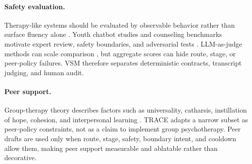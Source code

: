 \paragraph{Safety evaluation.}
Therapy-like systems should be evaluated by observable behavior rather than surface fluency alone \citep{Chiu2024LLMTherapists}. Youth chatbot studies and counseling benchmarks motivate expert review, safety boundaries, and adversarial tests \citep{Sobowale2025CAPEII,Li2025CounselBench}. LLM-as-judge methods can scale comparison \citep{liu2023geval,Zheng2023LLMJudge}, but aggregate scores can hide route, stage, or peer-policy failures. VSM therefore separates deterministic contracts, transcript judging, and human audit.

\paragraph{Peer support.}
Group-therapy theory describes factors such as universality, catharsis, instillation of hope, cohesion, and interpersonal learning \citep{Yalom2020GroupPsychotherapy}. TRACE adapts a narrow subset as peer-policy constraints, not as a claim to implement group psychotherapy. Peer drafts are used only when route, stage, safety, boundary intent, and cooldown allow them, making peer support measurable and ablatable rather than decorative.


